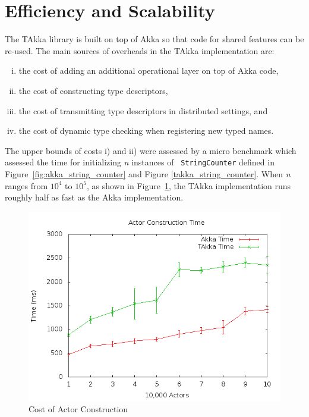 \section{Efficiency and Scalability}
\label{efficiency}




The TAkka library is built on top of Akka so that code for shared features 
can be re-used.  The main sources of overheads in the TAkka implementation
are:

\begin{enumerate}[i)]
  \item the cost of adding an additional operational layer on top of Akka 
code,
  \item the cost of constructing type descriptors,
  \item the cost of transmitting type descriptors in distributed settings, and
  \item the cost of dynamic type checking when registering new typed names.
\end{enumerate}

The upper bounds of costs i) and ii) were assessed by a micro 
benchmark which assessed the time for initializing {\it n} instances of {\tt 
StringCounter} defined in Figure~\ref{fig:akka_string_counter} and Figure 
\ref{takka_string_counter}. When {\it n} ranges from $10^4$ to $10^5$, as 
shown in Figure~\ref{cost_of_type}, the TAkka implementation runs roughly 
half as fast as the Akka implementation.  


\vspace{15pt}
\begin{figure}[h]
\begin{center}
\includegraphics[scale=0.6]{efficiency/Actor_Construction.png}
\caption{Cost of Actor Construction}
\label{cost_of_type}
\end{center}
\end{figure}



